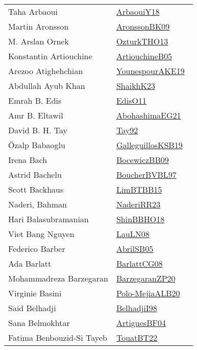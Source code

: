 {\begin{longtable}{p{4cm}p{20cm}}
Taha Arbaoui & \href{works/ArbaouiY18.pdf}{ArbaouiY18}~\cite{ArbaouiY18}\\
Martin Aronsson & \href{works/AronssonBK09.pdf}{AronssonBK09}~\cite{AronssonBK09}\\
M. Arslan Ornek & \href{works/OzturkTHO13.pdf}{OzturkTHO13}~\cite{OzturkTHO13}\\
Konstantin Artiouchine & \href{works/ArtiouchineB05.pdf}{ArtiouchineB05}~\cite{ArtiouchineB05}\\
Arezoo Atighehchian & \href{}{YounespourAKE19}~\cite{YounespourAKE19}\\
Abdullah Ayub Khan & \href{}{ShaikhK23}~\cite{ShaikhK23}\\
Emrah B. Edis & \href{works/EdisO11.pdf}{EdisO11}~\cite{EdisO11}\\
Amr B. Eltawil & \href{works/AbohashimaEG21.pdf}{AbohashimaEG21}~\cite{AbohashimaEG21}\\
David B. H. Tay & \href{}{Tay92}~\cite{Tay92}\\
{\"{O}}zalp Babaoglu & \href{works/GalleguillosKSB19.pdf}{GalleguillosKSB19}~\cite{GalleguillosKSB19}\\
Irena Bach & \href{}{BocewiczBB09}~\cite{BocewiczBB09}\\
Astrid Bachelu & \href{}{BoucherBVBL97}~\cite{BoucherBVBL97}\\
Scott Backhaus & \href{works/LimBTBB15.pdf}{LimBTBB15}~\cite{LimBTBB15}\\
Naderi, Bahman & \href{works/NaderiRR23.pdf}{NaderiRR23}~\cite{NaderiRR23}\\
Hari Balasubramanian & \href{works/ShinBBHO18.pdf}{ShinBBHO18}~\cite{ShinBBHO18}\\
Viet Bang Nguyen & \href{works/LauLN08.pdf}{LauLN08}~\cite{LauLN08}\\
Federico Barber & \href{works/AbrilSB05.pdf}{AbrilSB05}~\cite{AbrilSB05}\\
Ada Barlatt & \href{works/BarlattCG08.pdf}{BarlattCG08}~\cite{BarlattCG08}\\
Mohammadreza Barzegaran & \href{works/BarzegaranZP20.pdf}{BarzegaranZP20}~\cite{BarzegaranZP20}\\
Virginie Basini & \href{}{Polo-MejiaALB20}~\cite{Polo-MejiaALB20}\\
Said Belhadji & \href{works/BelhadjiI98.pdf}{BelhadjiI98}~\cite{BelhadjiI98}\\
Sana Belmokhtar & \href{works/ArtiguesBF04.pdf}{ArtiguesBF04}~\cite{ArtiguesBF04}\\
Fatima Benbouzid{-}Si Tayeb & \href{works/TouatBT22.pdf}{TouatBT22}~\cite{TouatBT22}\\

\end{longtable}}
